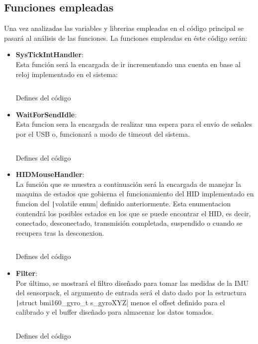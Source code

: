 \documentclass[a4paper,twoside]{article}
\begin{document}
\subsection{Funciones empleadas}
Una vez analizadas las variables y librerias empleadas en el código principal se pasará al análisis de las funciones. La funciones empleadas en éste código serán:
\begin{itemize}
  \item \textbf{SysTickIntHandler}:\\
Esta función será la encargada de ir incrementando una cuenta en base al reloj implementado en el sistema:
    \begin{listing}[h!]
    \inputminted[linenos,breaklines,frame=lines,framesep=2mm]{c}{codes/fun_tick.c}
    \caption{Defines del código}
    \end{listing}

\newpage
\item \textbf{WaitForSendIdle}:\\
Esta funcion sera la encargada de realizar una espera para el envio de señales por el USB o, funcionará a modo de timeout del sistema.
  \begin{listing}[h!]
  \inputminted[linenos,breaklines,frame=lines,framesep=2mm]{c}{codes/fun_idle.c}
  \caption{Defines del código}
  \end{listing}

\vspace{4cm}
\item \textbf{HIDMouseHandler}:\\
La función que se muestra a continuación será la encargada de manejar la maquina de estados que gobierna el funcionamiento del HID implementado en funcion del \texttt|volatile enum| definido anteriormente. Esta enumentacion contendrá los posibles estados en los que se puede encontrar el HID, es decir, conectado, desconectado, transmisión completada, suspendido o cuando se recupera tras la desconexion. \\
\newpage
  \begin{listing}[h!]
  \inputminted[linenos,breaklines,frame=lines,framesep=2mm]{c}{codes/fun_hid.c}
  \caption{Defines del código}
  \end{listing}
\newpage

\item \textbf{Filter}:\\
Por último, se mostrará el filtro diseñado para tomar las medidas de la IMU del sensorpack, el argumento de entrada será el dato dado por la  estructura \texttt|struct bmi160_gyro_t s_gyroXYZ| menos el offset definido para el calibrado y el buffer diseñado para almacenar los datos tomados.
    \begin{listing}[h!]
    \inputminted[linenos,breaklines,frame=lines,framesep=2mm]{c}{codes/fun_filt.c}
    \caption{Defines del código}
    \end{listing}

\end{itemize}
\end{document}
